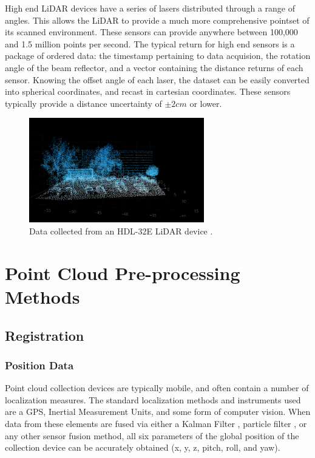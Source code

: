 \documentclass[12pt]{drexelthesis}
\let\Oldsection\section
\renewcommand{\section}{\FloatBarrier\Oldsection}
\let\Oldsubsection\subsection
\renewcommand{\subsection}{\FloatBarrier\Oldsubsection}
\let\Oldsubsubsection\subsubsection
\renewcommand{\subsubsection}{\FloatBarrier\Oldsubsubsection}
\begin{document}
High end LiDAR devices have a series of lasers distributed through a range of angles. This allows the LiDAR to provide a much more comprehensive pointset of its scanned environment. These sensors can provide anywhere between 100,000 and 1.5 million points per second. The typical return for high end sensors is a package of ordered data: the timestamp pertaining to data acquision, the rotation angle of the beam reflector, and a vector containing the distance returns of each sensor. Knowing the offset angle of each laser, the dataset can be easily converted into spherical coordinates, and recast in cartesian coordinates. These sensors typically provide a distance uncertainty of $\pm 2 cm$ or lower.

\begin{figure}[!ht]
	\centering
		\includegraphics[width=3in]{instruments/HDL-32eClean.png}
	\caption[Example of a high tier LiDAR sensor data output]{\centering Data collected from an HDL-32E LiDAR device \cite{velodyne}. }
\end{figure}




\section{Point Cloud Pre-processing Methods}
\label{sec:preprocessing}
\subsection{Registration}
\subsubsection{Position Data}
Point cloud collection devices are typically mobile, and often contain a number of localization measures. The standard localization methods and instruments used are a GPS, Inertial Measurement Units, and some form of computer vision. When data from these elements are fused via either a Kalman Filter \cite{kalmanfilter}, particle filter \cite{particlefilter}, or any other sensor fusion method, all six parameters of the global position of the collection device can be accurately obtained (x, y, z, pitch, roll, and yaw).
\end{document}
